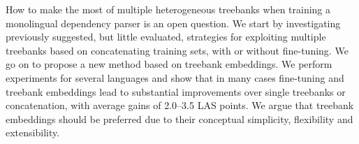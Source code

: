 How to make the most of multiple heterogeneous treebanks when training a monolingual dependency parser is an open question. We start by investigating previously suggested, but little evaluated, strategies for exploiting multiple treebanks based on concatenating training sets, with or without fine-tuning. We go on to propose a new method based on treebank embeddings. We perform experiments for several languages and show that in many cases fine-tuning and treebank embeddings lead to substantial improvements over single treebanks or concatenation, with average gains of 2.0--3.5 LAS points. We argue that treebank embeddings should be preferred due to their conceptual simplicity, flexibility and extensibility.
